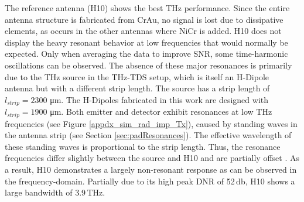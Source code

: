The reference antenna (H10) shows the best THz performance. Since the entire antenna structure is fabricated from CrAu, no signal is lost due to dissipative elements, as occurs in the other antennas where NiCr is added. H10 does not display the heavy resonant behavior at low frequencies that would normally be expected. Only when averaging the data to improve SNR, some time-harmonic oscillations can be observed. The absence of these major resonances is primarily due to the THz source in the THz-TDS setup, which is itself an H-Dipole antenna but with a different strip length. The source has a strip length of $l_{strip} = 2300$ \si{\micro\meter}. The H-Dipoles fabricated in this work are designed with $l_{strip} = 1900$ \si{\micro\meter}. Both emitter and detector exhibit resonances at low THz frequencies (see Figure \ref{appdx_sim_rad_imp_Tx}), caused by standing waves in the antenna strip (see Section \ref{sec:padResonances}). The effective wavelength of these standing waves is proportional to the strip length. Thus, the resonance frequencies differ slightly between the source and H10 and are partially offset \cite{nandiErAsInAlGaAsPhotoconductors2021}. As a result, H10 demonstrates a largely non-resonant response as can be observed in the frequency-domain. Partially due to its high peak DNR of \num{52}\,\si{\decibel}, H10 shows a large bandwidth of \num{3.9}\,\si{\tera \hertz}. 

